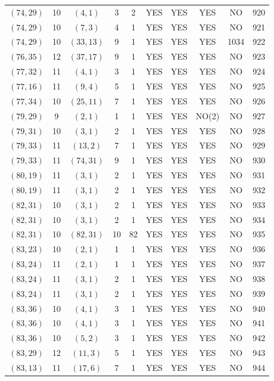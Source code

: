 \begin{longtable}{|c|c|c|c|c|c|c|c|c|c|}
$(74, 29)$ & 10 & $(4, 1)$ & 3 & 2 & YES & YES & YES & NO & 920\\
$(74, 29)$ & 10 & $(7, 3)$ & 4 & 1 & YES & YES & YES & NO & 921\\
$(74, 29)$ & 10 & $(33, 13)$ & 9 & 1 & YES & YES & YES & 1034 & 922\\
$(76, 35)$ & 12 & $(37, 17)$ & 9 & 1 & YES & YES & YES & NO & 923\\
$(77, 32)$ & 11 & $(4, 1)$ & 3 & 1 & YES & YES & YES & NO & 924\\
$(77, 16)$ & 11 & $(9, 4)$ & 5 & 1 & YES & YES & YES & NO & 925\\
$(77, 34)$ & 10 & $(25, 11)$ & 7 & 1 & YES & YES & YES & NO & 926\\
$(79, 29)$ & 9 & $(2, 1)$ & 1 & 1 & YES & YES & NO(2) & NO & 927\\
$(79, 31)$ & 10 & $(3, 1)$ & 2 & 1 & YES & YES & YES & NO & 928\\
$(79, 33)$ & 11 & $(13, 2)$ & 7 & 1 & YES & YES & YES & NO & 929\\
$(79, 33)$ & 11 & $(74, 31)$ & 9 & 1 & YES & YES & YES & NO & 930\\
$(80, 19)$ & 11 & $(3, 1)$ & 2 & 1 & YES & YES & YES & NO & 931\\
$(80, 19)$ & 11 & $(3, 1)$ & 2 & 1 & YES & YES & YES & NO & 932\\
$(82, 31)$ & 10 & $(3, 1)$ & 2 & 1 & YES & YES & YES & NO & 933\\
$(82, 31)$ & 10 & $(3, 1)$ & 2 & 1 & YES & YES & YES & NO & 934\\
$(82, 31)$ & 10 & $(82, 31)$ & 10 & 82 & YES & YES & YES & NO & 935\\
$(83, 23)$ & 10 & $(2, 1)$ & 1 & 1 & YES & YES & YES & NO & 936\\
$(83, 24)$ & 11 & $(2, 1)$ & 1 & 1 & YES & YES & YES & NO & 937\\
$(83, 24)$ & 11 & $(3, 1)$ & 2 & 1 & YES & YES & YES & NO & 938\\
$(83, 24)$ & 11 & $(3, 1)$ & 2 & 1 & YES & YES & YES & NO & 939\\
$(83, 36)$ & 10 & $(4, 1)$ & 3 & 1 & YES & YES & YES & NO & 940\\
$(83, 36)$ & 10 & $(4, 1)$ & 3 & 1 & YES & YES & YES & NO & 941\\
$(83, 36)$ & 10 & $(5, 2)$ & 3 & 1 & YES & YES & YES & NO & 942\\
$(83, 29)$ & 12 & $(11, 3)$ & 5 & 1 & YES & YES & YES & NO & 943\\
$(83, 13)$ & 11 & $(17, 6)$ & 7 & 1 & YES & YES & YES & NO & 944\\

\end{longtable}
